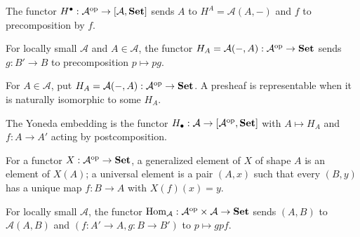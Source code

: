 \begin{definition}
\label{def:lbc-representables-assembly}
The functor $H^{\bullet}:\mathcal A^{\mathrm{op}}\to[\mathcal A,\mathbf{Set}]$ sends $A$ to
$H^A=\mathcal A(A,-)$ and $f$ to precomposition by $f$.
\end{definition}

\begin{definition}
\label{def:lbc-representable-op}
For locally small $\mathcal A$ and $A\in\mathcal A$, the functor
$H_A=\mathcal A(-,A):\mathcal A^{\mathrm{op}}\to\mathbf{Set}$ sends $g:B'\to B$ to
precomposition $p\mapsto p g$.
\end{definition}

\begin{definition}
\label{def:lbc-representable-contra}
For $A\in\mathcal A$, put $H_A=\mathcal A(-,A):\mathcal A^{\mathrm{op}}\to\mathbf{Set}$.
A presheaf is representable when it is naturally isomorphic to some $H_A$.
\end{definition}

\begin{definition}
\label{def:lbc-yoneda-embedding}
The Yoneda embedding is the functor
$H_{\bullet}:\mathcal A\to[\mathcal A^{\mathrm{op}},\mathbf{Set}]$ with $A\mapsto H_A$ and
$f:A\to A'$ acting by postcomposition.
\end{definition}

\begin{definition}
\label{def:lbc-generalized-element}
For a functor $X:\mathcal A^{\mathrm{op}}\to\mathbf{Set}$, a generalized element of $X$ of
shape $A$ is an element of $X(A)$; a universal element is a pair $(A,x)$ such
that every $(B,y)$ has a unique map $f:B\to A$ with $X(f)(x)=y$.
\end{definition}

\begin{definition}
\label{def:lbc-hom-bifunctor}
For locally small $\mathcal A$, the functor
$\operatorname{Hom}_{\mathcal A}:\mathcal A^{\mathrm{op}}\times\mathcal A\to\mathbf{Set}$ sends $(A,B)$ to
$\mathcal A(A,B)$ and $(f:A'\to A,g:B\to B')$ to
$p\mapsto gpf$.
\end{definition}

